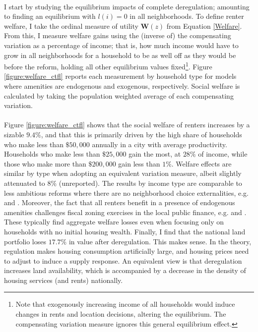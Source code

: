 \documentclass[12pt]{article}
\begin{document}
\paragraph*{}
I start by studying the equilibrium impacts of complete deregulation; amounting to finding an equilibrium with $l(i) = 0$ in all neighborhoods. To define renter welfare, I take the ordinal measure of utility $\boldsymbol{W}(z)$ from Equation \eqref{Welfare}. From this, I measure welfare gains using the (inverse of) the compensating variation as a percentage of income; that is, how much income would have to grow in all neighborhoods for a household to be as well off as they would be before the reform, holding all other equilibrium values fixed\footnote{Note that exogenously increasing income of all households would induce changes in rents and location decisions, altering the equilibrium. The compensating variation measure ignores this general equilibrium effect.}. Figure \ref{figure:welfare_ctfl} reports each measurement by household type for models where amenities are endogenous and exogenous, respectively. Social welfare is calculated by taking the population weighted average of each compensating variation.

\paragraph*{} Figure \ref{figure:welfare_ctfl} shows that the social welfare of renters increases by a sizable $9.4\%$, and that this is primarily driven by the high share of households who make less than $\$50,000$ annually in a city with average productivity. Households who make less than $\$25,000$ gain the most, at $28\%$ of income, while those who make more than $\$200,000$ gain less than $1\%$. Welfare effects are similar by type when adopting an equivalent variation measure, albeit slightly attenuated to $8 \%$ (unreported). The results by income type are comparable to less ambitious reforms where there are no neighborhood choice externalities, e.g. \cite{Song} and \cite{kulka}. Moreover, the fact that all renters benefit in a presence of endogenous amenities challenges fiscal zoning exercises in the local public finance, e.g. \cite{calabresetal} and \cite{ineffTiebout}. These typically find aggregate welfare losses even when focusing only on households with no initial housing wealth. Finally, I find that the national land portfolio loses $17.7\%$ in value after deregulation. This makes sense. In the theory, regulation makes housing consumption artificially large, and housing prices need to adjust to induce a supply response. An equivalent view is that deregulation increases land availability, which is accompanied by a decrease in the density of housing services (and rents) nationally.
\end{document}

